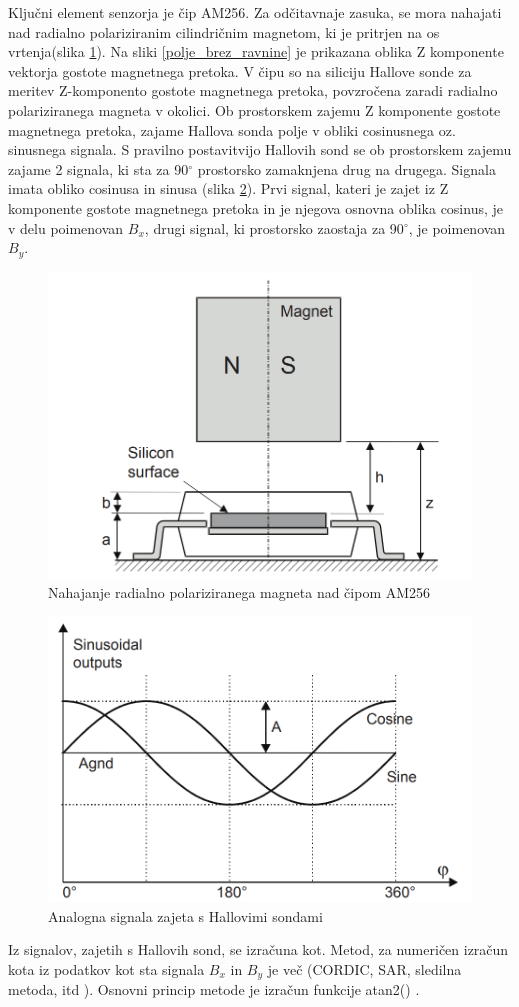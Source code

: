 Ključni element senzorja je čip AM256. Za odčitavnaje zasuka, se mora nahajati nad radialno polariziranim cilindričnim magnetom, ki je pritrjen na os vrtenja(slika \ref{stranski_ris}). Na sliki \ref{polje_brez_ravnine}  je prikazana oblika Z komponente vektorja gostote magnetnega pretoka. V čipu so na siliciju Hallove sonde za meritev Z-komponento gostote magnetnega pretoka, povzročena zaradi radialno polariziranega magneta v okolici. Ob prostorskem zajemu Z komponente gostote magnetnega pretoka, zajame Hallova sonda polje v obliki cosinusnega oz. sinusnega signala. S pravilno postavitvijo Hallovih sond se ob prostorskem zajemu zajame 2 signala, ki sta za 90$^\circ$ prostorsko zamaknjena drug na drugega. Signala imata obliko cosinusa in sinusa (slika \ref{BxBy}). Prvi signal, kateri je zajet iz Z komponente gostote magnetnega pretoka in je njegova osnovna oblika cosinus, je v delu poimenovan $B_x$, drugi signal, ki prostorsko zaostaja za 90$^\circ$, je poimenovan $B_y$.

\begin{figure}[h]
	\centering
	\includegraphics[width=0.5\columnwidth]{./Slike/stranski_ris.png}
	\caption{Nahajanje radialno polariziranega magneta nad čipom AM256 \cite{AM8192}}
	\label{stranski_ris}
\end{figure}
\begin{figure}[h]
	\centering
	\includegraphics[width=0.5\columnwidth]{./Slike/BxBy.png}
	\caption{Analogna signala zajeta s Hallovimi sondami \cite{AM8192}}
	\label{BxBy}
\end{figure}


Iz signalov, zajetih s Hallovih sond, se izračuna kot. Metod, za numeričen izračun kota iz podatkov kot sta signala $B_x$ in $B_y$ je več (CORDIC, SAR, sledilna metoda, itd \cite{ICHaus_interpolate}). Osnovni princip metode je izračun funkcije atan2() \cite{atan2Matlab}.

